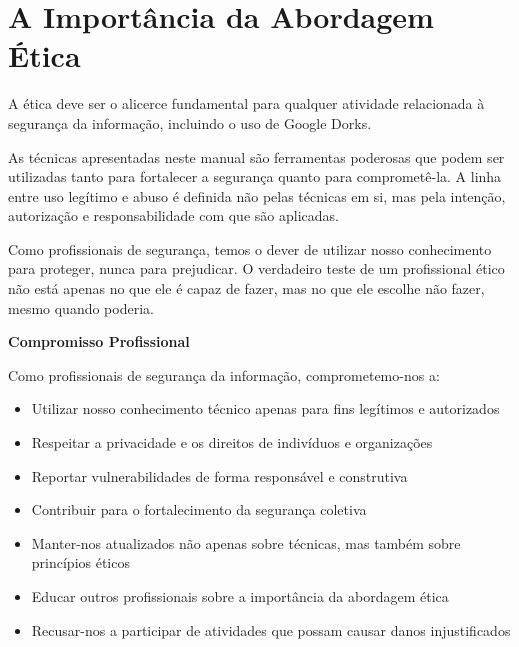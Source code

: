 \documentclass[12pt,a4paper]{book}
\begin{document}
\section{A Importância da Abordagem Ética}

A ética deve ser o alicerce fundamental para qualquer atividade relacionada à segurança da informação, incluindo o uso de Google Dorks.

\begin{alertbox}
As técnicas apresentadas neste manual são ferramentas poderosas que podem ser utilizadas tanto para fortalecer a segurança quanto para comprometê-la. A linha entre uso legítimo e abuso é definida não pelas técnicas em si, mas pela intenção, autorização e responsabilidade com que são aplicadas.

Como profissionais de segurança, temos o dever de utilizar nosso conhecimento para proteger, nunca para prejudicar. O verdadeiro teste de um profissional ético não está apenas no que ele é capaz de fazer, mas no que ele escolhe não fazer, mesmo quando poderia.
\end{alertbox}

\begin{mdframed}[backgroundcolor=verdeestabilidade!10, roundcorner=10pt, leftmargin=1cm, rightmargin=1cm]
\begin{center}
\textbf{\large Compromisso Profissional}
\end{center}

Como profissionais de segurança da informação, comprometemo-nos a:

\begin{itemize}
    \item Utilizar nosso conhecimento técnico apenas para fins legítimos e autorizados
    \item Respeitar a privacidade e os direitos de indivíduos e organizações
    \item Reportar vulnerabilidades de forma responsável e construtiva
    \item Contribuir para o fortalecimento da segurança coletiva
    \item Manter-nos atualizados não apenas sobre técnicas, mas também sobre princípios éticos
    \item Educar outros profissionais sobre a importância da abordagem ética
    \item Recusar-nos a participar de atividades que possam causar danos injustificados
\end{itemize}
\end{mdframed}
\end{document}
